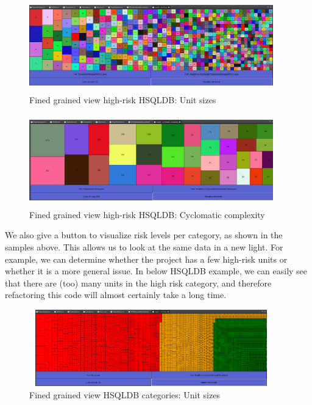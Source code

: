 \documentclass{article}
\begin{document}
\begin{figure}[!htbp]
	\centering
	\label{fig:unit-sizes}
	\caption{Fined grained view high-risk HSQLDB: Unit sizes}
	\includegraphics[width=400px, height=150px]{hsqldb_unitsizes.png}
\end{figure}

\begin{figure}[!htbp]
	\centering
	\label{fig:cyclomatic-complexity}
	\caption{Fined grained view high-risk HSQLDB: Cyclomatic complexity}
	\includegraphics[width=400px, height=150px]{hsqldb_coc.png}
\end{figure}

\clearpage 
We also give a button to visualize risk levels per category, as shown in the samples above.
This allows us to look at the same data in a new light.
For example, we can determine whether the project has a few high-risk units or whether it is a more general issue.
In below HSQLDB example, we can easily see that there are (too) many units in the high risk category, and therefore refactoring this code will almost certainly take a long time.


\begin{figure}[!htbp]
	\centering
	\label{fig:unit-sizes-cat}
	\caption{Fined grained view HSQLDB categories: Unit sizes}
	\includegraphics[width=400px, height=125px]{hsqldb_unitsizes_cat.png}
\end{figure}
\end{document}
